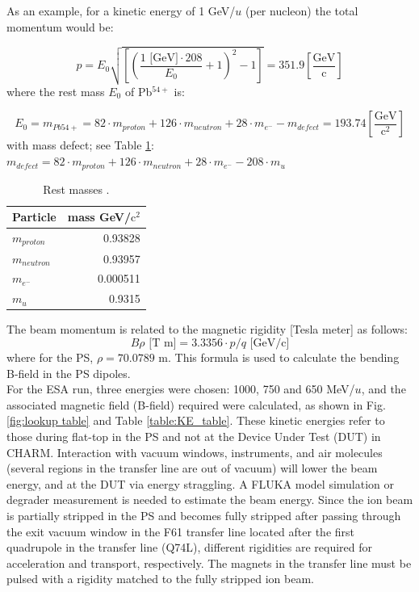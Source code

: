 \documentclass{cernatsnote}
\begin{document}
As an example, for a kinetic energy of 1 GeV/$u$ (per nucleon) the total momentum would be:

$$p = E_{0}\sqrt{\left [ \left( \frac{1\text{ [GeV]}\cdot 208}{E_{0}}+1\right )^{2}-1\right ]} = 351.9 \left[\frac{\text{GeV}}{\text{c}}\right]$$
where the rest mass $E_{0}$ of Pb$^{54+}$ is:

$$E_{0} = m_{Pb54+}= 82\cdot m_{proton} + 126\cdot m_{neutron} + 28\cdot m_{e^{-}} - m_{defect} = 193.74 \left[\frac{\text{GeV}}{\text{c}^{2}}\right]$$
with mass defect; see Table \ref{table:masses}: $m_{defect}=82\cdot m_{proton} + 126\cdot m_{neutron} + 28\cdot m_{e^{-}} - 208\cdot m_{u}$ 

\begin{table}[h!]
\centering
\begin{tabular}{lr}
\toprule
Particle & mass GeV/$\text{c}^{2}$\\
\midrule
$m_{proton}$ & 0.93828      \\
$m_{neutron}$ & 0.93957      \\
$m_{e^{-}}$ & 0.000511 \\
$m_{u}$ & 0.9315       \\
\bottomrule
\end{tabular}
\caption{Rest masses \cite{boston_university_nuclear_nodate}.}
\label{table:masses}
\end{table}

The beam momentum is related to the magnetic rigidity [Tesla meter] as follows: 
$$B\rho \text{ [T m]} = 3.3356\cdot p/q \text{ [GeV/c]}$$
where for the PS, $\rho = 70.0789$ m. This formula is used to calculate the bending B-field in the PS dipoles.
\\

For the ESA run, three energies were chosen: 1000, 750 and 650 MeV/$u$, and the associated magnetic field (B-field) required were calculated, as shown in Fig. \ref{fig:lookup table} and Table \ref{table:KE_table}. These kinetic energies refer to those during flat-top in the PS and not at the Device Under Test (DUT) in CHARM. Interaction with vacuum windows, instruments, and air molecules (several regions in the transfer line are out of vacuum) will lower the beam energy, and at the DUT via energy straggling. A FLUKA model simulation or degrader measurement is needed to estimate the beam energy. Since the ion beam is partially stripped in the PS and becomes fully stripped after passing through the exit vacuum window in the F61 transfer line located after the first quadrupole in the transfer line (Q74L), different rigidities are required for acceleration and transport, respectively. The magnets in the transfer line must be pulsed with a rigidity matched to the fully stripped ion beam.
\end{document}
